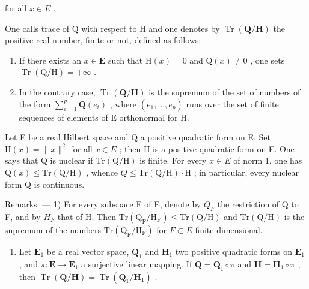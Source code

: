 for all \(x \in E\) .

One calls trace of Q with respect to H and one denotes by \(\operatorname{Tr}\left(\mathbf{Q}/\mathbf{H}\right)\) the positive real number, finite or not, defined as follows:

\begin{enumerate}
\def\labelenumi{\alph{enumi})}
\item
  If there exists an \(x \in \mathbf{E}\) such that \(\mathrm{H}(x) = 0\) and \(\mathrm{Q}(x) \neq 0\) , one sets \(\operatorname{Tr}(\mathrm{Q} / \mathrm{H}) = +\infty\) .
\item
  In the contrary case, \(\operatorname{Tr}(\mathbf{Q}/\mathbf{H})\) is the supremum of the set of numbers of the form \(\sum_{i=1}^{p} \mathbf{Q}(e_i)\) , where \((e_1, \ldots, e_p)\) runs over the set of finite sequences of elements of E orthonormal for H.
\end{enumerate}

Let E be a real Hilbert space and Q a positive quadratic form on E. Set \(\mathrm{H}(x)=\|x\|^{2}\) for all \(x\in E\) ; then H is a positive quadratic form on E. One says that Q is nuclear if \(\mathrm{Tr}\left(\mathrm{Q}/\mathrm{H}\right)\) is finite. For every \(x\in E\) of norm 1, one has \(\mathrm{Q}(x)\leqslant\mathrm{Tr}\left(\mathrm{Q}/\mathrm{H}\right)\) , whence \(Q\leqslant\mathrm{Tr}\left(\mathrm{Q}/\mathrm{H}\right)\cdot\mathrm{H}\) ; in particular, every nuclear form Q is continuous.

Remarks. --- 1) For every subspace F of E, denote by \(Q_{F}\) the restriction of Q to F, and by \(H_{F}\) that of H. Then \(\mathrm{Tr}\left(\mathrm{Q}_{\mathrm{F}}/\mathrm{H}_{\mathrm{F}}\right) \leqslant \mathrm{Tr}\left(\mathrm{Q}/\mathrm{H}\right)\) and \(\mathrm{Tr}\left(\mathrm{Q}/\mathrm{H}\right)\) is the supremum of the numbers \(\mathrm{Tr}\left(\mathrm{Q}_{\mathrm{F}}/\mathrm{H}_{\mathrm{F}}\right)\) for \(F \subset E\) finite-dimensional.

\begin{enumerate}
\def\labelenumi{\arabic{enumi})}
\setcounter{enumi}{1}
\tightlist
\item
  Let \(\mathbf{E}_1\) be a real vector space, \(\mathbf{Q}_1\) and \(\mathbf{H}_1\) two positive quadratic forms on \(\mathbf{E}_1\) , and \(\pi: \mathbf{E} \to \mathbf{E}_1\) a surjective linear mapping. If \(\mathbf{Q} = \mathbf{Q}_1 \circ \pi\) and \(\mathbf{H} = \mathbf{H}_1 \circ \pi\) , then \(\operatorname{Tr}(\mathbf{Q} / \mathbf{H}) = \operatorname{Tr}(\mathbf{Q}_1 / \mathbf{H}_1)\) .
\end{enumerate}

